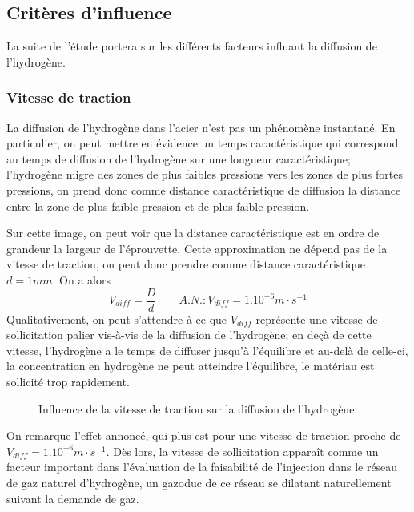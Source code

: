 \documentclass[a4paper, french, 11pt, draft]{article}
\newcommand{\nuance}[1]{\og #1 \fg}
\begin{document}
    \subsection{Critères d'influence}
    La suite de l'étude portera sur les différents facteurs influant la diffusion de l'hydrogène.

    \subsubsection{Vitesse de traction}
    La diffusion de l'hydrogène dans l'acier n'est pas un phénomène instantané. En particulier, on peut mettre en évidence un temps caractéristique qui correspond au temps de diffusion de l'hydrogène sur une longueur caractéristique;
    l'hydrogène migre des zones de plus faibles pressions vers les zones de plus fortes pressions, on prend donc comme distance caractéristique de diffusion la distance entre la zone de plus faible pression et de plus faible pression.


    Sur cette image, on peut voir que la distance caractéristique est en ordre de grandeur la largeur de l'éprouvette. Cette approximation ne dépend pas de la vitesse de traction, on peut donc prendre comme distance caractéristique \(d = 1mm\). On a alors \[V_{diff} = \frac{D}{d} \qquad A.N. : V_{diff} = 1.10^{-6}m \cdot s^{-1}\]
    Qualitativement, on peut s'attendre à ce que \(V_{diff}\) représente une vitesse de sollicitation \nuance{palier} vis-à-vis de la diffusion de l'hydrogène; en deçà de cette vitesse, l'hydrogène a \nuance{le temps} de diffuser jusqu'à l'équilibre et au-delà de celle-ci, la concentration en hydrogène ne peut atteindre l'équilibre, le matériau est sollicité trop rapidement.
    
    \begin{figure}[ht]
        \centering
        \caption{Influence de la vitesse de traction sur la diffusion de l'hydrogène}
        \label{anim:3vitesse}
    \end{figure}

    On remarque l'effet annoncé, qui plus est pour une vitesse de traction proche de \(V_{diff} = 1.10^{-6}m \cdot s^{-1}\). Dès lors, la vitesse de sollicitation apparaît comme un facteur important dans l'évaluation de la faisabilité de l'injection dans le réseau de gaz naturel d'hydrogène, un gazoduc de ce réseau se dilatant naturellement suivant la demande de gaz.
\end{document}
